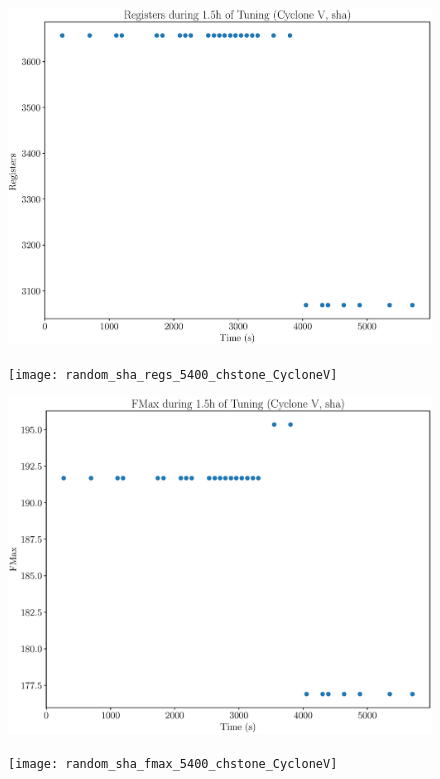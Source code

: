 \documentclass[12pt, a4paper]{article}
\begin{document}
\begin{figure}[htpb]
    \begin{minipage}{.48\textwidth}
        \includegraphics[scale=.25]{sha_regs_5400_chstone_CycloneV}
    \end{minipage}%
    \hfill
    \begin{minipage}{.48\textwidth}
        \texttt{[image: random\_sha\_regs\_5400\_chstone\_CycloneV]}
    \end{minipage}%

    \begin{minipage}{.48\textwidth}
        \includegraphics[scale=.25]{sha_fmax_5400_chstone_CycloneV}
    \end{minipage}%
    \hfill
    \begin{minipage}{.48\textwidth}
        \texttt{[image: random\_sha\_fmax\_5400\_chstone\_CycloneV]}
    \end{minipage}%
\end{figure}
\end{document}

